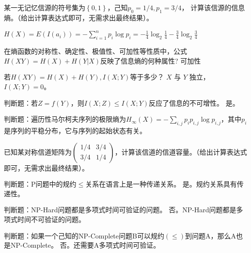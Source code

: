 \begin{problem}
	某一无记忆信源的符号集为$\left\{0,1\right\}$，己知$p_0= 1/4,p_1=3/4$， 计算该信源的信息熵。（给出计算表达式即可，无需求出最终结果）。
\end{problem}
\begin{solution}
	$H(X) = E(I(a_i)) = -\sum_{i = 1}^np_i\log p_i = -\frac{1}{4}\log_2 \frac{1}{4} - \frac{3}{4}\log_2 \frac{3}{4}$
\end{solution}

\begin{problem}
	在熵函数的对称性、确定性、极值性、可加性等性质中，公式$H(XY)=H(X)+H(Y|X)$反映了信息熵的何种属性?
	\solution 可加性
\end{problem}

\begin{problem}
	若$H(XY)=H(X)+H(Y),I(X;Y)$等于多少？
	\solution $X$ 与 $Y$ 独立，$I(X; Y) = 0$。
\end{problem}

\begin{problem}
	判断题：若$Z=f(Y)$，则$I(X;Z)\le I(X;Y)$反应了信息的不可增性。
	\solution 是。
\end{problem}

\begin{problem}[\todo]
	判断题：遍历性马尔柯夫序列的极限熵为$H_\infty(X)=-\sum_{i,j}p_ip_{i,j}\log p_{i,j}$，其中$p_i$是序列的平稳分布，它与序列的起始状态有关。
	\solution
\end{problem}

\begin{problem}[\todo]
	已知某对称信道矩阵为$\begin{pmatrix}1/4&3/4\\3/4&1/4\end{pmatrix}$，计算该信道的信道容量。（给出计算表达式即可，无需求出最终结果）。
	\solution
\end{problem}

\begin{problem}
	判断题：P问题中的规约$\le$关系在语言上是一种传递关系。
	\solution 是。规约关系具有传递性。
\end{problem}

\begin{problem}
	判断题：NP-Hard问题都是多项式时间可验证的问题。
	\solution 否。NP-Hard问题都是多项式时间不可验证的问题。
\end{problem}

\begin{problem}
	判断题：如果一个己知的NP-Complete问题B可以规约$(\le)$到问题A，那么A也是NP-Complete。
	\solution 否。还需要A多项式时间可验证。
\end{problem}


